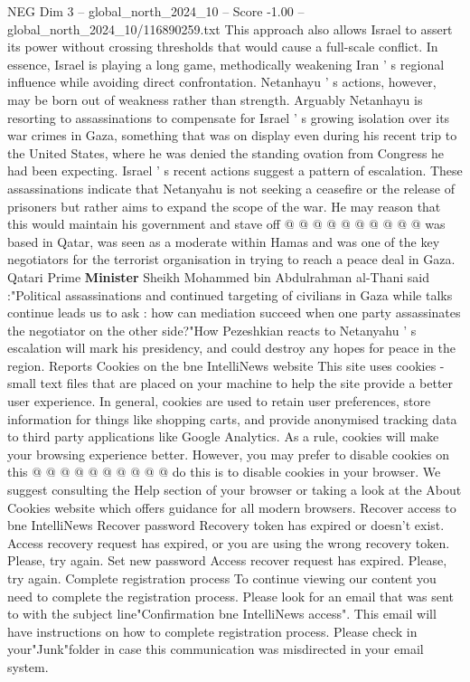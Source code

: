 \begin{textsample}{NEG Dim 3 – global\_north\_2024\_10 – Score -1.00 – global\_north\_2024\_10/116890259.txt}
This approach also allows Israel to assert its power without crossing thresholds that would cause a full-scale conflict.
In essence, Israel is playing a long game, methodically weakening Iran ' s regional influence while avoiding direct confrontation.
Netanhayu ' s actions, however, may be born out of weakness rather than strength.
Arguably Netanhayu is resorting to assassinations to compensate for Israel ' s growing isolation over its war crimes in Gaza, something that was on display even during his recent trip to the United States, where he was denied the standing ovation from Congress he had been expecting.
Israel ' s recent actions suggest a pattern of escalation.
These assassinations indicate that Netanyahu is not seeking a ceasefire or the release of prisoners but rather aims to expand the scope of the war.
He may reason that this would maintain his government and stave off @ @ @ @ @ @ @ @ @ @ was based in Qatar, was seen as a moderate within Hamas and was one of the key negotiators for the terrorist organisation in trying to reach a peace deal in Gaza.
Qatari Prime \textbf{Minister} Sheikh Mohammed bin Abdulrahman al-Thani said :"Political assassinations and continued targeting of civilians in Gaza while talks continue leads us to ask : how can mediation succeed when one party assassinates the negotiator on the other side?"How Pezeshkian reacts to Netanyahu ' s escalation will mark his presidency, and could destroy any hopes for peace in the region.
Reports Cookies on the bne IntelliNews website This site uses cookies - small text files that are placed on your machine to help the site provide a better user experience.
In general, cookies are used to retain user preferences, store information for things like shopping carts, and provide anonymised tracking data to third party applications like Google Analytics.
As a rule, cookies will make your browsing experience better.
However, you may prefer to disable cookies on this @ @ @ @ @ @ @ @ @ @ do this is to disable cookies in your browser.
We suggest consulting the Help section of your browser or taking a look at the About Cookies website which offers guidance for all modern browsers.
Recover access to bne IntelliNews Recover password Recovery token has expired or doesn't exist.
Access recovery request has expired, or you are using the wrong recovery token.
Please, try again.
Set new password Access recover request has expired.
Please, try again.
Complete registration process To continue viewing our content you need to complete the registration process.
Please look for an email that was sent to with the subject line"Confirmation bne IntelliNews access".
This email will have instructions on how to complete registration process.
Please check in your"Junk"folder in case this communication was misdirected in your email system.

\end{textsample}
